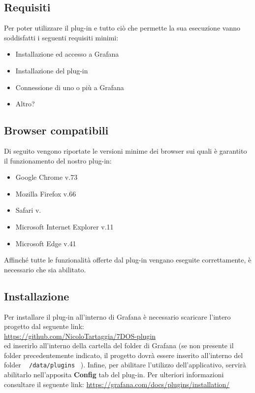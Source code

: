 \subsection{Requisiti}
Per poter utilizzare il plug-in e tutto ciò che permette la sua esecuzione vanno soddisfatti i seguenti requisiti minimi:
\begin{itemize}
	\item{Installazione ed accesso a Grafana}
	\item{Installazione del plug-in}
	\item{Connessione di uno o più  a Grafana}
	\item{Altro?} 
\end{itemize}
\subsection{Browser compatibili}
Di seguito vengono riportate le versioni minime dei browser sui quali è garantito il funzionamento del nostro plug-in:
\begin{itemize}
	\item{Google Chrome v.73}
	\item{Mozilla Firefox v.66}
	\item{Safari v.}
	\item{Microsoft Internet Explorer v.11}
	\item{Microsoft Edge v.41} \\
\end{itemize}

Affinché tutte le funzionalità offerte dal plug-in vengano eseguite correttamente, è necessario che  sia abilitato.
\subsection{Installazione}
Per installare il plug-in all'interno di Grafana è necessario scaricare l'intero progetto dal seguente link: \\
\hspace*{10mm}\url{https://github.com/NicoloTartaggia/7DOS-plugin}\\
ed inserirlo all'interno della cartella  del folder di Grafana (se non presente il folder precedentemente indicato, il progetto dovrà essere inserito all'interno del folder ~ \texttt{/data/plugins} ~).
Infine, per abilitare l'utilizzo dell'applicativo, servirà abilitarlo nell'apposita \textbf{Config} tab del plug-in.
Per ulteriori informazioni consultare il seguente link:
\url{https://grafana.com/docs/plugins/installation/}

